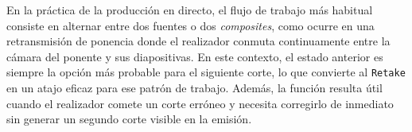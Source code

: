 En la práctica de la producción en directo, el flujo de trabajo más habitual consiste
en alternar entre dos fuentes o dos \textit{composites}, como ocurre en una retransmisión de
ponencia donde el realizador conmuta continuamente entre la cámara del ponente y sus
diapositivas. En este contexto, el estado anterior es siempre la opción más probable
para el siguiente corte, lo que convierte al \texttt{Retake} en un atajo eficaz para ese patrón
de trabajo. Además, la función resulta útil cuando el realizador comete un
corte erróneo y necesita corregirlo de inmediato sin generar un segundo corte visible
en la emisión.
